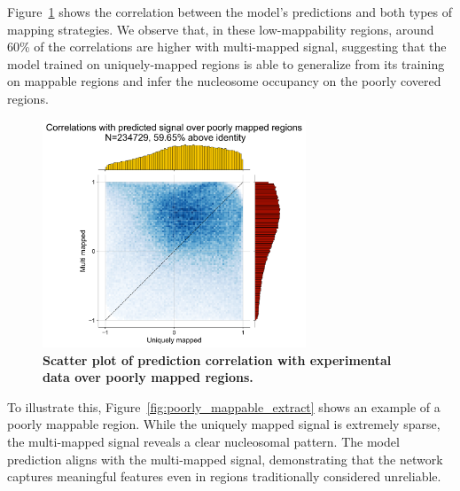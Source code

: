 \documentclass[11pt]{book}
\begin{document}
Figure~\ref{fig:corr_poorly_mappable} shows the correlation between the model's predictions and both types of mapping strategies. We observe that, in these low-mappability regions, around 60\% of the correlations are higher with multi-mapped signal, suggesting that the model trained on uniquely-mapped regions is able to generalize from its training on mappable regions and infer the nucleosome occupancy on the poorly covered regions.

\begin{figure}[htbp]
    \centering
    \includegraphics[width=0.7\textwidth]{Figures/Results/correlation_scatter_poorlymapped.pdf}
    \caption{\textbf{Scatter plot of prediction correlation with experimental data over poorly mapped regions.}}

    \label{fig:corr_poorly_mappable}
\end{figure}

To illustrate this, Figure~\ref{fig:poorly_mappable_extract} shows an example of a poorly mappable region. While the uniquely mapped signal is extremely sparse, the multi-mapped signal reveals a clear nucleosomal pattern. The model prediction aligns with the multi-mapped signal, demonstrating that the network captures meaningful features even in regions traditionally considered unreliable.
\end{document}
